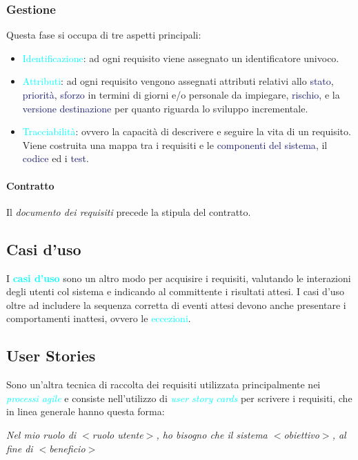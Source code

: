 \subsubsection{Gestione}

Questa fase si occupa di tre aspetti principali:
\begin{itemize}
    \item \textcolor{cyan}{Identificazione}: ad ogni requisito viene assegnato un identificatore univoco.
    \item \textcolor{cyan}{Attributi}: ad ogni requisito vengono assegnati attributi relativi allo \textcolor{MidnightBlue}{stato},
        \textcolor{MidnightBlue}{priorità}, \textcolor{MidnightBlue}{sforzo} in termini di giorni e/o personale da impiegare, \textcolor{MidnightBlue}{rischio},
        e la \textcolor{MidnightBlue}{versione destinazione} per quanto riguarda lo sviluppo incrementale. 
    \item \textcolor{cyan}{Tracciabilità}: ovvero la capacità di descrivere e seguire la vita di un requisito. Viene costruita una mappa tra i requisiti
        e le \textcolor{MidnightBlue}{componenti del sistema}, il \textcolor{MidnightBlue}{codice} ed i \textcolor{MidnightBlue}{test}.
\end{itemize}

\paragraph{Contratto} Il \emph{documento dei requisiti} precede la stipula del contratto.

\subsection{Casi d'uso}

I \textbf{\textcolor{cyan}{casi d'uso}} sono un altro modo per acquisire i requisiti, valutando le interazioni degli utenti col sistema
e indicando al committente i risultati attesi. I casi d'uso oltre ad includere la sequenza corretta di eventi attesi devono anche presentare i comportamenti inattesi,
ovvero le \textcolor{cyan}{eccezioni}.

\subsection{User Stories}

Sono un'altra tecnica di raccolta dei requisiti utilizzata principalmente nei \emph{\textcolor{cyan}{processi agile}} e consiste
nell'utilizzo di \emph{\textcolor{cyan}{user story cards}} per scrivere i requisiti, che in linea generale hanno questa forma:
\begin{center}
    \emph{Nel mio ruolo di $<$ruolo utente$>$, ho bisogno che il sistema $<$obiettivo$>$, al fine di $<$beneficio$>$}
\end{center}

